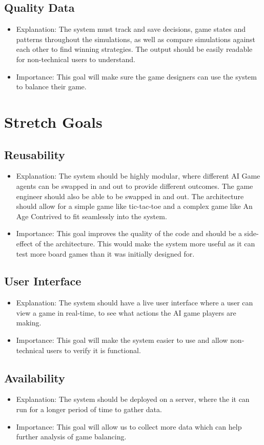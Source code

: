 \documentclass{article}
\begin{document}
\subsection*{Quality Data}
\begin{itemize}
  \item Explanation: The system must track and save decisions, game states and patterns throughout the simulations, as well as compare simulations against each other to find winning strategies. The output should be easily readable for non-technical users to understand.
  \item Importance: This goal will make sure the game designers can use the system to balance their game.
\end{itemize}


\section{Stretch Goals}
\subsection{Reusability}
\begin{itemize}
\item Explanation: The system should be highly modular, where different AI Game agents can be swapped in and out to provide different outcomes. The game engineer should also be able
to be swapped in and out. The architecture should allow for a simple game like tic-tac-toe and a complex game like An Age Contrived to fit seamlessly into the system.
\item Importance: This goal improves the quality of the code and should be a side-effect of the architecture. This would make the system more useful as it can test more board games than it was initially designed for.
\end{itemize}

\subsection{User Interface}
\begin{itemize}
\item Explanation: The system should have a live user interface where a user can view a game in real-time, to see what actions the AI game players are making.
\item Importance: This goal will make the system easier to use and allow non-technical users to verify it is functional.
\end{itemize}

\subsection{Availability}
\begin{itemize}
  \item Explanation: The system should be deployed on a server, where the it can run for a longer period of time to gather data.
  \item Importance: This goal will allow us to collect more data which can help further analysis of game balancing.
\end{itemize}
\end{document}
